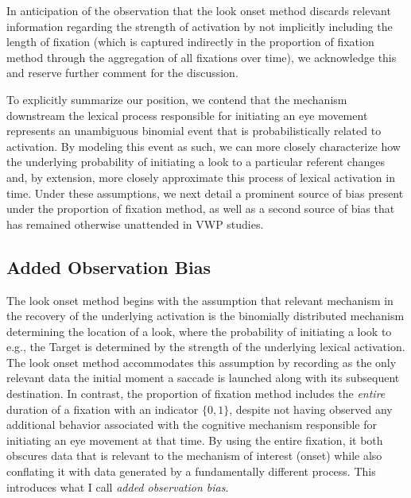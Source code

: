 \documentclass{article}
\begin{document}
In anticipation of the observation that the look onset method discards relevant information regarding the strength of activation by not implicitly including the length of fixation (which is captured indirectly in the proportion of fixation method through the aggregation of all fixations over time), we acknowledge this and reserve further comment for the discussion.

To explicitly summarize our position, we contend that the mechanism downstream the lexical process responsible for initiating an eye movement represents an unambiguous binomial event that is probabilistically related to activation. By modeling this event as such, we can more closely characterize how the underlying probability of initiating a look to a particular referent changes and, by extension, more closely approximate this process of lexical activation in time. Under these assumptions, we next detail a prominent source of bias present under the proportion of fixation method, as well as a second source of bias that has remained otherwise unattended in VWP studies. 

\subsection{Added Observation Bias}

The look onset method begins with the assumption that relevant mechanism in the recovery of the underlying activation is the binomially distributed mechanism determining the location of a look, where the probability of initiating a look to e.g., the Target is determined by the strength of the underlying lexical activation. The look onset method accommodates this assumption by recording as the only relevant data the initial moment a saccade is launched along with its subsequent destination. In contrast, the proportion of fixation method includes the \textit{entire} duration of a fixation with an indicator $\{0,1\}$, despite not having observed any additional behavior associated with the cognitive mechanism responsible for initiating an eye movement at that time. By using the entire fixation, it both obscures data that is relevant to the mechanism of interest (onset) while also conflating it with data generated by a fundamentally different process. This introduces what I call \textit{added observation bias}.
\end{document}
